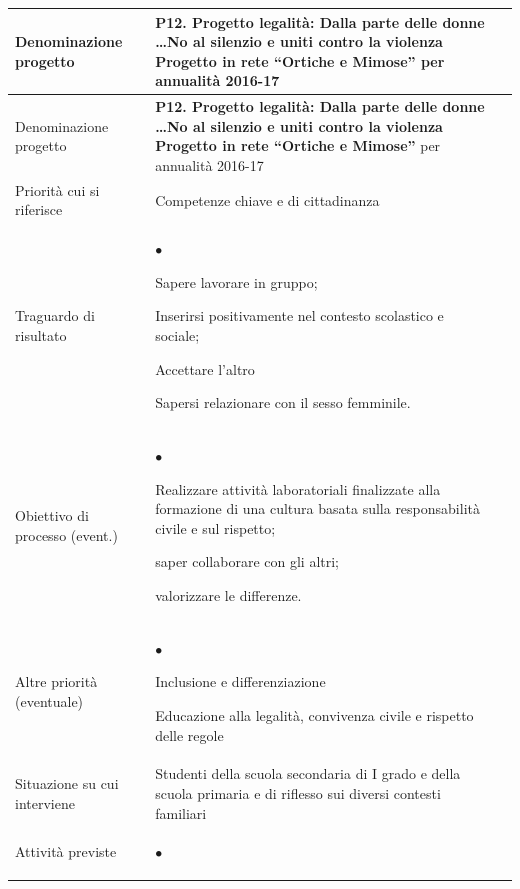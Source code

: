 \documentclass[12pt,a4paper,oneside]{memoir}
\newenvironment{elenco}{\begin{list}{$\bullet$}{%
              \setlength{\leftmargin}{4mm}%
              \setlength{\rightmargin}{1mm}%
               \setlength{\itemindent}{0mm}%
               \setlength{\labelwidth}{2mm}%
               \setlength{\labelsep}{2mm}%
              \setlength{\itemsep}{-\parsep}%
              \setlength{\partopsep}{0pt}%
              \setlength{\topsep}{0pt}%
             \setlength{\parskip}{0pt}%
              }}{\end{list}}
\begin{document}
\begin{footnotesize}
\begin{longtable}{|>{\raggedright}p{2.5cm}|>{\raggedright\arraybackslash}P{10cm}|}
\hline
{}
\label{P12}Denominazione progetto&\textbf{P12. Progetto legalità: Dalla parte delle donne \ldots No al silenzio e uniti contro la violenza  Progetto in rete ``Ortiche e Mimose''} per annualità 2016-17\\ \hline \endfirsthead
\hline
{}
Denominazione progetto&\textbf{P12. Progetto legalità: Dalla parte delle donne \ldots No al silenzio e uniti contro la violenza  Progetto in rete ``Ortiche e Mimose''} per annualità 2016-17\\ \hline \endhead
{}
\endfoot
\hline
\endlastfoot
Priorità cui si riferisce&Competenze chiave e di cittadinanza\\ \hline
Traguardo di risultato&
\begin{elenco}
\item Sapere lavorare in gruppo; 
\item Inserirsi positivamente nel contesto scolastico e sociale;
\item Accettare l'altro
\item Sapersi relazionare con il sesso femminile.
\end{elenco}\\[-4mm] \hline
Obiettivo di processo (event.) &
\begin{elenco}
\item Realizzare attività laboratoriali finalizzate alla formazione di una cultura basata sulla responsabilità civile e sul rispetto;
\item saper collaborare con gli altri;
\item valorizzare le differenze.
\end{elenco}\\[-4mm] \hline
Altre priorità (eventuale)&
\begin{elenco}
\item Inclusione e differenziazione
\item Educazione alla legalità, convivenza civile e rispetto delle regole 
\end{elenco}\\ \hline
Situazione su cui interviene&Studenti della scuola secondaria di I grado e della scuola primaria e di riflesso sui diversi contesti familiari\\ \hline
Attività previste&
\begin{elenco}

\end{elenco}
\end{longtable}
\end{footnotesize}
\end{document}

